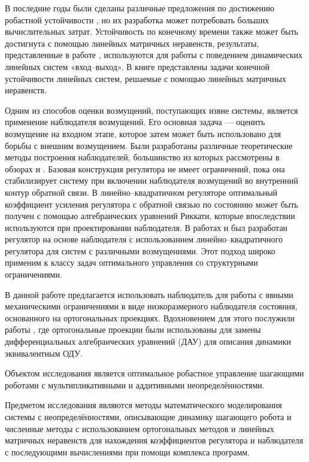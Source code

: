В последние годы были сделаны различные предложения по достижению робастной устойчивости \cite{LMI7, LMI8}, но их разработка может потребовать больших вычислительных затрат.
Устойчивость по конечному времени также может быть достигнута с помощью линейных матричных неравенств, результаты, представленные в работе \cite{LMI6}, используются для работы с поведением динамических линейных систем «вход--выход». В книге \cite{Amato2011} представлены задачи конечной устойчивости линейных систем, решаемые с помощью линейных матричных неравенств.

Одним из способов оценки возмущений, поступающих извне системы, является применение наблюдателя возмущений. Его основная задача --- оценить возмущение на входном этапе, которое затем может быть использовано для борьбы с внешним возмущением. Были разработаны различные теоретические методы построения наблюдателей, большинство из которых рассмотрены в обзорах \cite{ObserverITMO} и \cite{Disturb_obs}. Базовая конструкция регулятора не имеет ограничений, пока она стабилизирует систему при включении наблюдателя возмущений во внутренний контур обратной связи. В линейно--квадратичном регуляторе оптимальный коэффициент усиления регулятора с обратной связью по состоянию может быть получен с помощью алгебраических уравнений Риккати, которые впоследствии используются при проектировании наблюдателя. В работах \cite{LQR1} и \cite{LQR2} был разработан регулятор на основе наблюдателя с использованием линейно--квадратичного регулятора для систем с различными возмущениями. Этот подход широко применим к классу задач оптимального управления со структурными ограничениями. 

В данной работе предлагается использовать наблюдатель для работы с явными механическими ограничениями в виде низкоразмерного наблюдателя состояния, основанного на ортогональных проекциях. Вдохновением для этого послужили работы \cite{SAVIN2021, Righetti2011}, где ортогональные проекции были использованы для замены дифференциальных алгебраических уравнений (ДАУ) для описания динамики эквивалентным ОДУ. 

{\objectsubject} 

Объектом исследования является оптимальное робастное управление шагающими роботами с мультипликативными и аддитивными неопределённостями.

Предметом исследования являются методы математического моделирования системы с неопределённостями, описывающие динамику шагающего робота и численные методы с использованием ортогональных методов и линейных матричных неравенств для нахождения коэффициентов регулятора и наблюдателя с последующими вычислениями при помощи комплекса программ.

